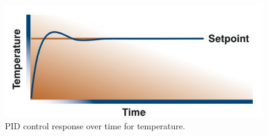 	\begin{figure}[h!]
    \centering
    \includegraphics[scale=0.6]{4-experiment-design/img/mechanical/proportionalcontroltemp.JPG}
	\caption{PID control response over time for temperature.}
	\label{fig:PIDcontroltemp}
	\end{figure}

